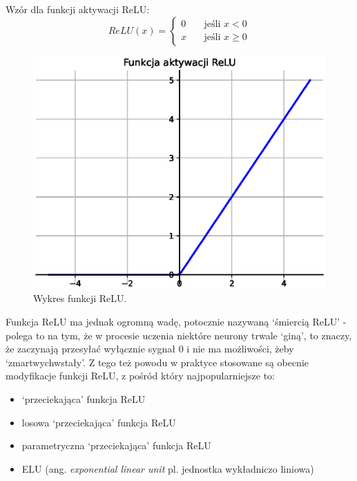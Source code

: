 \documentclass[a4paper,11pt]{article}
\begin{document}
    \bigskip

    Wzór dla funkcji aktywacji ReLU: \\
    \begin{equation}
        \label{equ:relu}
        ReLU(x) =
        \begin{cases}
            0 & \quad \text{jeśli } x < 0 \\
            x & \quad \text{jeśli } x \geq 0
        \end{cases}
    \end{equation}

    \bigskip

    \begin{figure}[H]
        \label{fig:relu}
        \centering
        \includegraphics[width=\textwidth]{relu}
        \caption{Wykres funkcji ReLU.}
    \end{figure}

    \bigskip

    Funkcja ReLU ma jednak ogromną wadę, potocznie nazywaną `śmiercią ReLU' - polega to na tym, że w procesie uczenia niektóre neurony trwale `giną', to znaczy, że zaczynają przesyłać wyłącznie sygnał 0 i nie ma możliwości, żeby `zmartwychwstały'\cite{UczenieMaszynowe2018}. Z tego też powodu w praktyce stosowane są obecnie modyfikacje funkcji ReLU, z pośród który najpopularniejsze to:
    \begin{itemize}
        \item `przeciekająca' funkcja ReLU
        \item losowa `przeciekająca' funkcja ReLU
        \item parametryczna `przeciekająca' funkcja ReLU
        \item ELU (ang. \textit{exponential linear unit} pl. jednostka wykładniczo liniowa)
    \end{itemize}
\end{document}
